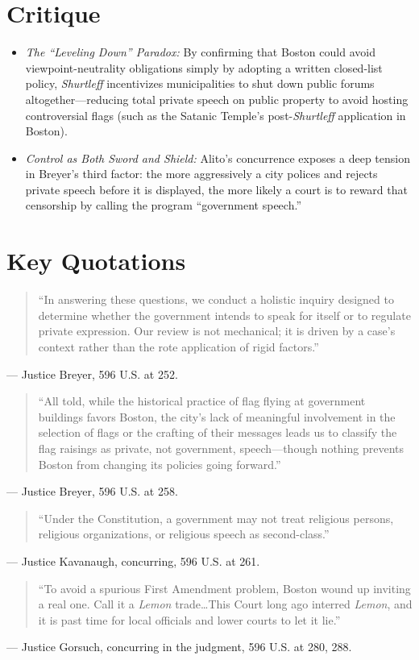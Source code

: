 \documentclass[12pt]{article}
\begin{document}
\section{Critique}
\begin{itemize}
  \item \textit{The ``Leveling Down'' Paradox:} By confirming that Boston could avoid viewpoint-neutrality obligations simply by adopting a written closed-list policy, \textit{Shurtleff} incentivizes municipalities to shut down public forums altogether---reducing total private speech on public property to avoid hosting controversial flags (such as the Satanic Temple's post-\textit{Shurtleff} application in Boston).
  \item \textit{Control as Both Sword and Shield:} Alito's concurrence exposes a deep tension in Breyer's third factor: the more aggressively a city polices and rejects private speech before it is displayed, the more likely a court is to reward that censorship by calling the program ``government speech.''
\end{itemize}

\section{Key Quotations}
\begin{quote}
``In answering these questions, we conduct a holistic inquiry designed to determine whether the government intends to speak for itself or to regulate private expression. Our review is not mechanical; it is driven by a case's context rather than the rote application of rigid factors.''
\end{quote}
\noindent --- Justice Breyer, 596 U.S. at 252.

\begin{quote}
``All told, while the historical practice of flag flying at government buildings favors Boston, the city's lack of meaningful involvement in the selection of flags or the crafting of their messages leads us to classify the flag raisings as private, not government, speech---though nothing prevents Boston from changing its policies going forward.''
\end{quote}
\noindent --- Justice Breyer, 596 U.S. at 258.

\begin{quote}
``Under the Constitution, a government may not treat religious persons, religious organizations, or religious speech as second-class.''
\end{quote}
\noindent --- Justice Kavanaugh, concurring, 596 U.S. at 261.

\begin{quote}
``To avoid a spurious First Amendment problem, Boston wound up inviting a real one. Call it a \textit{Lemon} trade\ldots This Court long ago interred \textit{Lemon}, and it is past time for local officials and lower courts to let it lie.''
\end{quote}
\noindent --- Justice Gorsuch, concurring in the judgment, 596 U.S. at 280, 288.
\end{document}
